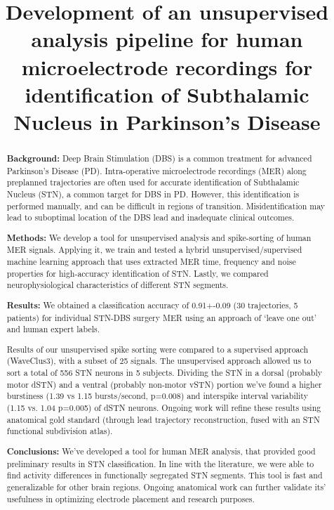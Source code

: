 \documentclass[10pt,a4paper]{memoir}
\title{Development of an unsupervised analysis pipeline for human microelectrode recordings for identification of Subthalamic Nucleus in Parkinson's Disease}
\date{}
\begin{document}
\maketitle
\begin{abstract}
\textbf{Background: }Deep Brain Stimulation (DBS) is a common treatment for advanced Parkinson's Disease (PD). Intra-operative microelectrode recordings (MER) along preplanned trajectories are often used for accurate identification of Subthalamic Nucleus (STN), a common target for DBS in PD. However, this identification is performed manually, and can be difficult in regions of transition. Misidentification may lead to suboptimal location of the DBS lead and inadequate clinical outcomes.

\textbf{Methods: }We develop a tool for unsupervised analysis and spike-sorting of human MER signals.  Applying it, we train and tested a hybrid unsupervised/supervised machine learning approach that uses extracted MER time, frequency and noise properties for high-accuracy identification of STN. Lastly, we compared neurophysiological characteristics of different STN segments.

\textbf{Results: }We obtained a classification accuracy of 0.91+-0.09 (30 trajectories, 5 patients) for individual STN-DBS surgery MER using an approach of ‘leave one out’ and human expert labels.

Results of our unsupervised spike sorting were compared to a supervised approach (WaveClus3), with a subset of 25 signals. The unsupervised approach allowed us to sort a total of 556 STN neurons in 5 subjects. Dividing the STN in a dorsal (probably motor dSTN) and a ventral (probably non-motor vSTN) portion we’ve found a higher burstiness (1.39 vs 1.15 bursts/second, p=0.008) and interspike interval variability (1.15 vs. 1.04 p=0.005) of dSTN neurons. Ongoing work will refine these results using anatomical gold standard (through lead trajectory reconstruction, fused with an STN functional subdivision atlas).

\textbf{Conclusions:} We’ve developed a tool for human MER analysis, that provided good preliminary results in STN classification. In line with the literature, we were able to find activity differences in functionally segregated STN segments. This tool is fast and generalizable for other brain regions. Ongoing anatomical work can further validate its’ usefulness in optimizing electrode placement and research purposes.
\end{abstract}
\end{document}
